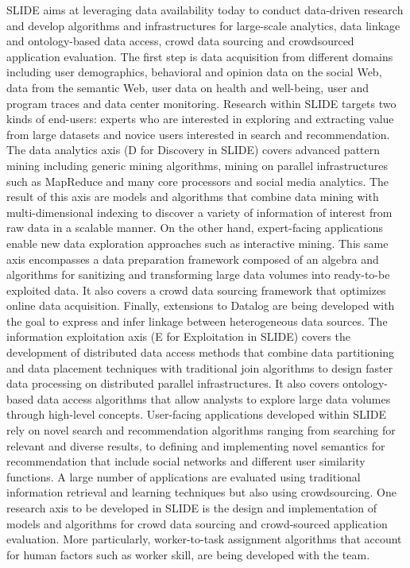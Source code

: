 SLIDE aims at leveraging data availability today to conduct
data-driven research and develop algorithms and infrastructures for
large-scale analytics, data linkage and ontology-based data access,
crowd data sourcing and crowdsourced application evaluation. The first
step is data acquisition from different domains including user
demographics, behavioral and opinion data on the social Web, data from
the semantic Web, user data on health and well-being, user and program
traces and data center monitoring.  Research within SLIDE targets two
kinds of end-users: experts who are interested in exploring and
extracting value from large datasets and novice users interested in
search and recommendation.  The data analytics axis (D for Discovery
in SLIDE) covers advanced pattern mining including generic mining
algorithms, mining on parallel infrastructures such as MapReduce and
many core processors and social media analytics. The result of this
axis are models and algorithms that combine data mining with
multi-dimensional indexing to discover a variety of information of
interest from raw data in a scalable manner. On the other hand,
expert-facing applications enable new data exploration approaches such
as interactive mining. This same axis encompasses a data preparation
framework composed of an algebra and algorithms for sanitizing and
transforming large data volumes into ready-to-be exploited data. It
also covers a crowd data sourcing framework that optimizes online data
acquisition. Finally, extensions to Datalog are being developed with
the goal to express and infer linkage between heterogeneous data
sources.  The information exploitation axis (E for Exploitation in
SLIDE) covers the development of distributed data access methods that
combine data partitioning and data placement techniques with
traditional join algorithms to design faster data processing on
distributed parallel infrastructures. It also covers ontology-based
data access algorithms that allow analysts to explore large data
volumes through high-level concepts. User-facing applications
developed within SLIDE rely on novel search and recommendation
algorithms ranging from searching for relevant and diverse results, to
defining and implementing novel semantics for recommendation that
include social networks and different user similarity functions.  A
large number of applications are evaluated using traditional
information retrieval and learning techniques but also using
crowdsourcing. One research axis to be developed in SLIDE is the
design and implementation of models and algorithms for crowd data
sourcing and crowd-sourced application evaluation. More particularly,
worker-to-task assignment algorithms that account for human factors
such as worker skill, are being developed with the team.

